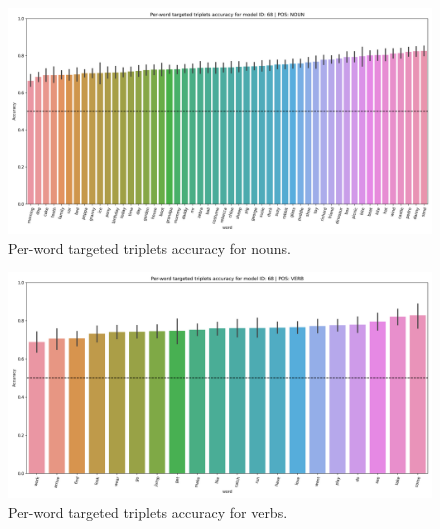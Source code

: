 \begin{figure}
  \centering
  \includegraphics[width=\textwidth]{results/targeted_triplets/results_NOUN_word.png}
  \caption{Per-word targeted triplets accuracy for nouns.}
  \label{fig:accuracy_targeted_triplets_nouns}
\end{figure}

\begin{figure}
  \centering
  \includegraphics[width=\textwidth]{results/targeted_triplets/results_VERB_word.png}
  \caption{Per-word targeted triplets accuracy for verbs.}
  \label{fig:accuracy_targeted_triplets_verbs}
\end{figure}

 
